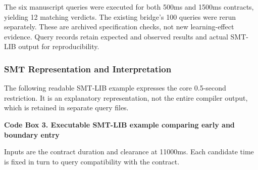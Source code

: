 \documentclass[nolineno]{ieeeaccess}
\begin{document}
The six manuscript queries were executed for both 500ms and 1500ms contracts, yielding 12 matching verdicts. The existing bridge's 100 queries were rerun separately. These are archived specification checks, not new learning-effect evidence. Query records retain expected and observed results and actual SMT-LIB output for reproducibility.\par

\subsubsection{SMT Representation and Interpretation}

The following readable SMT-LIB example expresses the core 0.5-second restriction. It is an explanatory representation, not the entire compiler output, which is retained in separate query files.\par

\textbf{Code Box 3. Executable SMT-LIB example comparing early and boundary entry}\par

Inputs are the contract duration and clearance at 11000ms. Each candidate time is fixed in turn to query compatibility with the contract.\par
\end{document}
